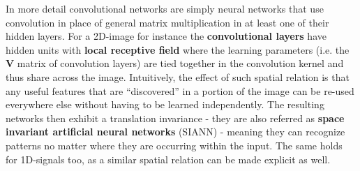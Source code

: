 
In more detail convolutional networks are simply neural networks that use convolution in place of general matrix multiplication in at least one of their hidden layers.
For a 2D-image for instance the \textbf{convolutional layers} have hidden units with \textbf{local receptive field} where the learning parameters (i.e. the $\bm{V}$ matrix of convolution layers) are tied together in the convolution kernel and thus share across the image. Intuitively, the effect of such spatial relation is that any useful features that are “discovered” in a portion
of the image can be re-used everywhere else without having to be learned independently. The resulting networks then exhibit a translation invariance - they are also referred as \textbf{space invariant artificial neural networks} (SIANN) - meaning they can recognize patterns no matter where they are occurring within the input.
The same holds for 1D-signals too, as a similar spatial relation can be made explicit as well.

